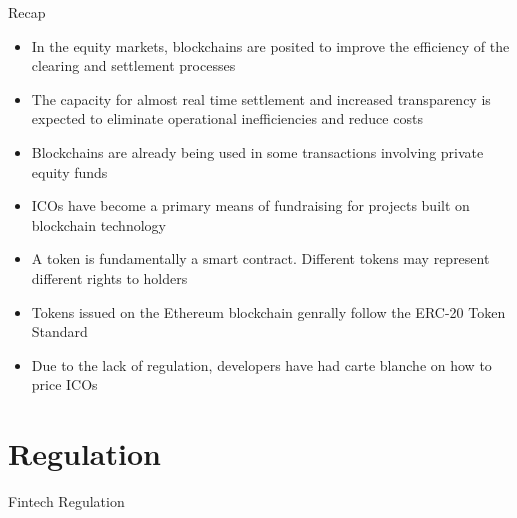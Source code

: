 \documentclass[10pt]{beamer}
\begin{document}

\begin{frame}{Recap}
	\begin{itemize}
		\item In the equity markets, blockchains are posited to improve the efficiency of the clearing and settlement processes
		\item The capacity for almost real time settlement and increased transparency is expected to eliminate operational inefficiencies and reduce costs
		\item Blockchains are already being used in some transactions involving private equity funds
		\item ICOs have become a primary means of fundraising for projects built on blockchain technology
		\item A token is fundamentally a smart contract. Different tokens may represent different rights to holders
		\item Tokens issued on the Ethereum blockchain genrally follow the ERC-20 Token Standard
		\item Due to the lack of regulation, developers have had carte blanche on how to price ICOs
	\end{itemize}
\end{frame}


\section{Regulation}

\begin{frame}
	\begin{center}
		\begin{large}
			Fintech Regulation
		\end{large}
	\end{center}
\end{frame}



\end{document}
